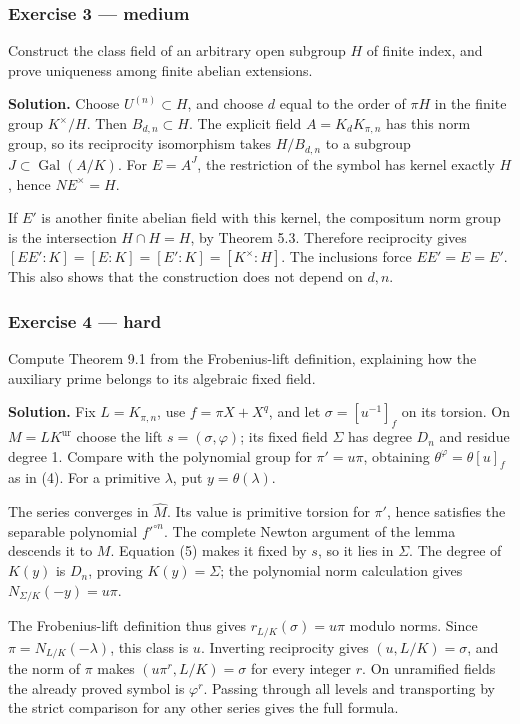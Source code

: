 \documentclass[11pt,a4paper]{article}
\begin{document}
\subsubsection{Exercise 3 --- medium}\label{exercise-3-medium}

Construct the class field of an arbitrary open subgroup \(H\) of finite
index, and prove uniqueness among finite abelian extensions.

\textbf{Solution.} Choose \(U^{(n)}\subset H\), and choose \(d\) equal
to the order of \(\pi H\) in the finite group \(K^\times/H\). Then
\(B_{d,n}\subset H\). The explicit field \(A=K_dK_{\pi,n}\) has this
norm group, so its reciprocity isomorphism takes \(H/B_{d,n}\) to a
subgroup \(J\subset\operatorname{Gal}(A/K)\). For \(E=A^J\), the
restriction of the symbol has kernel exactly \(H\), hence
\(NE^\times=H\).

If \(E'\) is another finite abelian field with this kernel, the
compositum norm group is the intersection \(H\cap H=H\), by Theorem 5.3.
Therefore reciprocity gives \([EE':K]=[E:K]=[E':K]=[K^\times:H]\). The
inclusions force \(EE'=E=E'\). This also shows that the construction
does not depend on \(d,n\).

\subsubsection{Exercise 4 --- hard}\label{exercise-4-hard}

Compute Theorem 9.1 from the Frobenius-lift definition, explaining how
the auxiliary prime belongs to its algebraic fixed field.

\textbf{Solution.} Fix \(L=K_{\pi,n}\), use \(f=\pi X+X^q\), and let
\(\sigma=[u^{-1}]_f\) on its torsion. On \(M=LK^{\mathrm{ur}}\) choose
the lift \(s=(\sigma,\varphi)\); its fixed field \(\Sigma\) has degree
\(D_n\) and residue degree 1. Compare with the polynomial group for
\(\pi'=u\pi\), obtaining \(\theta^\varphi=\theta[u]_f\) as in (4). For a
primitive \(\lambda\), put \(y=\theta(\lambda)\).

The series converges in \(\widehat M\). Its value is primitive torsion
for \(\pi'\), hence satisfies the separable polynomial \(f'^{\circ n}\).
The complete Newton argument of the lemma descends it to \(M\). Equation
(5) makes it fixed by \(s\), so it lies in \(\Sigma\). The degree of
\(K(y)\) is \(D_n\), proving \(K(y)=\Sigma\); the polynomial norm
calculation gives \(N_{\Sigma/K}(-y)=u\pi\).

The Frobenius-lift definition thus gives \(r_{L/K}(\sigma)=u\pi\) modulo
norms. Since \(\pi=N_{L/K}(-\lambda)\), this class is \(u\). Inverting
reciprocity gives \((u,L/K)=\sigma\), and the norm of \(\pi\) makes
\((u\pi^r,L/K)=\sigma\) for every integer \(r\). On unramified fields
the already proved symbol is \(\varphi^r\). Passing through all levels
and transporting by the strict comparison for any other series gives the
full formula.
\end{document}
